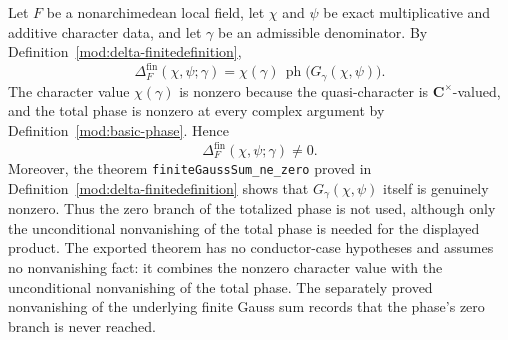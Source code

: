 \begin{theorem}\label{mod:delta-nonvanishing}
Let $F$ be a nonarchimedean local field, let $\chi$ and $\psi$ be exact
multiplicative and additive character data, and let $\gamma$ be an admissible
denominator.  By Definition~\ref{mod:delta-finitedefinition},
\[
 \Delta_F^{\mathrm{fin}}(\chi,\psi;\gamma)
 =\chi(\gamma)\,
   \operatorname{ph}\bigl(G_\gamma(\chi,\psi)\bigr).
\]
The character value $\chi(\gamma)$ is nonzero because the quasi-character is
$\mathbf C^\times$-valued, and the total phase is nonzero at every complex
argument by Definition~\ref{mod:basic-phase}.  Hence
\[
 \Delta_F^{\mathrm{fin}}(\chi,\psi;\gamma)\ne0.
\]
Moreover, the theorem
\texttt{finiteGaussSum\_ne\_zero} proved in
Definition~\ref{mod:delta-finitedefinition} shows that
$G_\gamma(\chi,\psi)$ itself is genuinely nonzero.  Thus the zero branch of
the totalized phase is not used, although only the unconditional
nonvanishing of the total phase is needed for the displayed product.
\leanok
{}
\FormalizationContract The exported theorem has no conductor-case hypotheses
and assumes no nonvanishing fact: it combines the nonzero character value
with the unconditional nonvanishing of the total phase.  The separately
proved nonvanishing of the underlying finite Gauss sum records that the
phase's zero branch is never reached.
\end{theorem}
